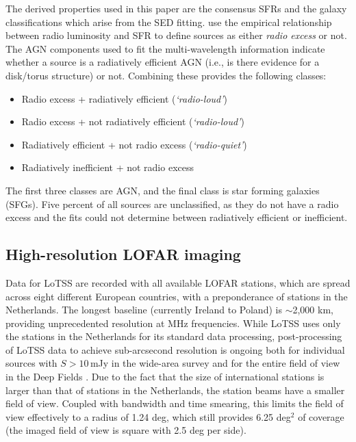 \documentclass[usenatbib,fleqn,letters]{mnras}
\begin{document}
The derived properties used in this paper are the consensus SFRs and the galaxy classifications which arise from the SED fitting.  use the empirical relationship between radio luminosity and SFR to define sources as either \textit{radio excess} or not. The AGN components used to fit the multi-wavelength information indicate whether a source is a radiatively efficient AGN (i.e., is there evidence for a disk/torus structure) or not. Combining these provides the following classes:
\begin{itemize}
    \item Radio excess + radiatively efficient (\textit{`radio-loud'})
    \item Radio excess + not radiatively efficient (\textit{`radio-loud'})
    \item Radiatively efficient + not radio excess (\textit{`radio-quiet'})
    \item Radiatively inefficient + not radio excess
\end{itemize}
The first three classes are AGN, and the final class is star forming galaxies (SFGs).  Five percent of all sources are unclassified, as they do not have a radio excess and the fits could not determine between radiatively efficient or inefficient. 


\subsection{High-resolution LOFAR imaging}
\label{subsec:highres}

Data for LoTSS are recorded with all available LOFAR stations, which are spread across eight different European countries, with a preponderance of stations in the Netherlands. The longest baseline (currently Ireland to Poland) is $\sim$2,000 km, providing unprecedented resolution at MHz frequencies. While LoTSS uses only the stations in the Netherlands for its standard data processing, post-processing of LoTSS data to achieve sub-arcsecond resolution is ongoing both for individual sources with $S>10\,$mJy in the wide-area survey \citep{morabito_sub-arcsecond_2022} and for the entire field of view in the Deep Fields \citep[][Escott et al., in prep; Bondi et al., in prep]{sweijen_deep_2022,de_jong_into_2024}. %
Due to the fact that the size of international stations is larger than that of stations in the Netherlands, the station beams have a smaller field of view. Coupled with bandwidth and time smearing, this limits the field of view effectively to a radius of 1.24 deg, which still provides 6.25 deg$^2$ of coverage (the imaged field of view is square with 2.5 deg per side). 
\end{document}
